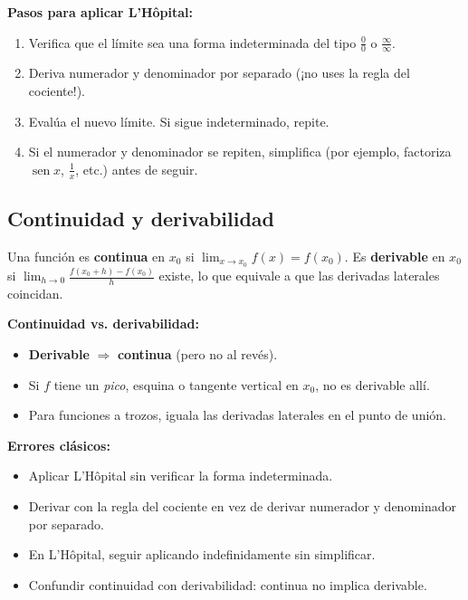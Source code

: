 \documentclass[12pt, letterpaper]{article}
\begin{document}
\begin{cuadropasos}
  \textbf{Pasos para aplicar L'Hôpital:}
  \begin{enumerate}
    \item Verifica que el límite sea una forma indeterminada del tipo $\frac{0}{0}$ o $\frac{\infty}{\infty}$.
    \item Deriva numerador y denominador por separado (¡no uses la regla del cociente!).
    \item Evalúa el nuevo límite. Si sigue indeterminado, repite.
    \item Si el numerador y denominador se repiten, simplifica (por ejemplo, factoriza $\operatorname{sen} x$, $\frac{1}{x}$, etc.) antes de seguir.
  \end{enumerate}
\end{cuadropasos}

\subsection{Continuidad y derivabilidad}

Una función es \textbf{continua} en $x_0$ si $\lim_{x\to x_0} f(x) = f(x_0)$. Es \textbf{derivable} en $x_0$ si $\lim_{h\to0}\frac{f(x_0+h)-f(x_0)}{h}$ existe, lo que equivale a que las derivadas laterales coincidan.

\begin{cuadroteoria}
  \textbf{Continuidad vs. derivabilidad:}
  \begin{itemize}
    \item \textbf{Derivable} $\Rightarrow$ \textbf{continua} (pero no al revés).
    \item Si $f$ tiene un \emph{pico}, esquina o tangente vertical en $x_0$, no es derivable allí.
    \item Para funciones a trozos, iguala las derivadas laterales en el punto de unión.
  \end{itemize}
\end{cuadroteoria}

\begin{cuadroadvertencia}
  \textbf{Errores clásicos:}
  \begin{itemize}
    \item Aplicar L'Hôpital sin verificar la forma indeterminada.
    \item Derivar con la regla del cociente en vez de derivar numerador y denominador por separado.
    \item En L'Hôpital, seguir aplicando indefinidamente sin simplificar.
    \item Confundir continuidad con derivabilidad: continua no implica derivable.
  \end{itemize}
\end{cuadroadvertencia}
\end{document}
